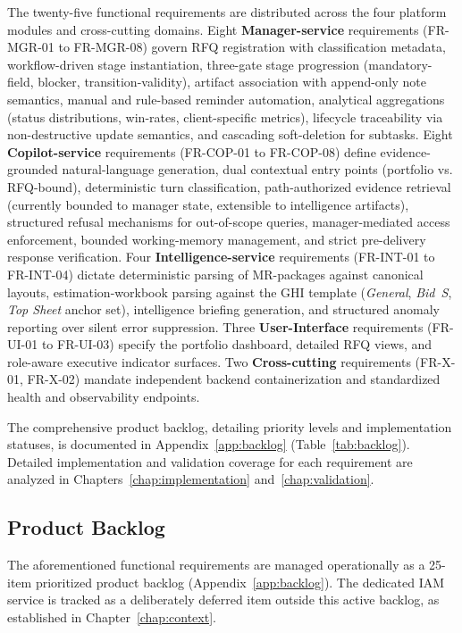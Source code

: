The twenty-five functional requirements are distributed across the four platform modules and cross-cutting domains. Eight \textbf{Manager-service} requirements (FR-MGR-01 to FR-MGR-08) govern RFQ registration with classification metadata, workflow-driven stage instantiation, three-gate stage progression (mandatory-field, blocker, transition-validity), artifact association with append-only note semantics, manual and rule-based reminder automation, analytical aggregations (status distributions, win-rates, client-specific metrics), lifecycle traceability via non-destructive update semantics, and cascading soft-deletion for subtasks. Eight \textbf{Copilot-service} requirements (FR-COP-01 to FR-COP-08) define evidence-grounded natural-language generation, dual contextual entry points (portfolio vs. RFQ-bound), deterministic turn classification, path-authorized evidence retrieval (currently bounded to manager state, extensible to intelligence artifacts), structured refusal mechanisms for out-of-scope queries, manager-mediated access enforcement, bounded working-memory management, and strict pre-delivery response verification. Four \textbf{Intelligence-service} requirements (FR-INT-01 to FR-INT-04) dictate deterministic parsing of MR-packages against canonical layouts, estimation-workbook parsing against the GHI template (\textit{General}, \textit{Bid~S}, \textit{Top Sheet} anchor set), intelligence briefing generation, and structured anomaly reporting over silent error suppression. Three \textbf{User-Interface} requirements (FR-UI-01 to FR-UI-03) specify the portfolio dashboard, detailed RFQ views, and role-aware executive indicator surfaces. Two \textbf{Cross-cutting} requirements (FR-X-01, FR-X-02) mandate independent backend containerization and standardized health and observability endpoints.

The comprehensive product backlog, detailing priority levels and implementation statuses, is documented in Appendix~\ref{app:backlog} (Table~\ref{tab:backlog}). Detailed implementation and validation coverage for each requirement are analyzed in Chapters~\ref{chap:implementation} and~\ref{chap:validation}.

\subsection{Product Backlog}
The aforementioned functional requirements are managed operationally as a 25-item prioritized product backlog (Appendix~\ref{app:backlog}). The dedicated IAM service is tracked as a deliberately deferred item outside this active backlog, as established in Chapter~\ref{chap:context}.

